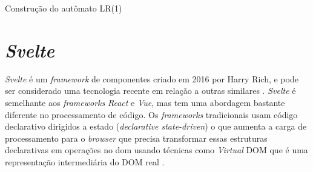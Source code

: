 \begin{algorithm}[ht]
    \caption{Construção do autômato LR(1)}\label{alg:automatonlr1}
\end{algorithm}

\section{\textit{Svelte}}
\textit{Svelte} é um \textit{framework} de componentes criado em 2016 por Harry Rich, e pode ser considerado uma tecnologia recente em relação a outras similares \cite{krill_slim_2016}. \textit{Svelte} é semelhante aos \textit{frameworks} \textit{React} e \textit{Vue}, mas tem uma abordagem bastante diferente no processamento de código. Os \textit{frameworks} tradicionais usam código declarativo dirigidos a estado (\textit{declarative state-driven}) o que aumenta a carga de processamento para o \textit{browser} que precisa transformar essas estruturas declarativas em operações no \gls{dom} usando técnicas como \textit{Virtual} DOM que é uma representação intermediária do DOM real \cite{harris_svelte_2019}.

